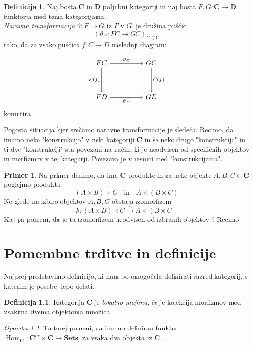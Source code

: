 \documentclass[12pt,a4paper]{book}
\theoremstyle{definition}
\newtheorem{definicija}{Definicija}[chapter]
\theoremstyle{plain}
\theoremstyle{definition}
\newtheorem{primer}{Primer}[section]
\theoremstyle{remark}
\newtheorem*{opomba}{Opomba}
\newcommand{\cat}[1]{\textbf{#1}}
\DeclareMathOperator{\Hom}{Hom}
\begin{document}
\begin{definicija}
Naj bosta $\cat{C}$ in $\cat{D}$ poljubni kategoriji in naj bosta $F,G : \cat{C} \to \cat{D}$ funktorja med tema kategorijama. \\
\textit{Naravna transformacija} $\vartheta : F \Rightarrow G$ iz $F$ v $G$, je družina puščic 
$$(\vartheta_C : FC \to GC)_{C \in \cat{C}}$$
tako, da za vsako puščico $f : C \to D$ naslednji diagram:

\begin{equation}
\begin{tikzcd}[sep=huge]
FC \arrow[r, "\vartheta_C"] \arrow[d, "F(f)"'] & GC \arrow[d, "G(f)"] \\
FD \arrow[r, "\vartheta_D"'] & GD
\end{tikzcd}
\end{equation}
komutira
\end{definicija}


Pogosta situacija kjer srečamo naravne transformacije je sledeča. Recimo, da imamo neko "konstrukcijo" v neki kategoriji \cat{C} in še neko drugo "konstrukcijo" in ti dve "konstrukciji" sta povezani na način, ki je neodvisen od specifičnih objektov in morfizmov v tej kategorji. Povezava je v resnici med "konstrukcijama". 
\begin{primer}
Na primer denimo, da ima \cat{C} produkte in za neke objekte $A,B,C \in \cat{C}$ poglejmo produkta
$$(A \times B) \times C \quad \text{in} \quad A \times (B \times C)$$
Ne glede na izbiro objektov $A,B,C$ obstaja izomorfizem
$$h : (A \times B) \times C \xrightarrow{\sim} A \times (B \times C)$$
Kaj pa pomeni, da je ta izomorfizem neodvisen od izbranih objektov ? Recimo
\end{primer}



\chapter{Pomembne trditve in definicije}

Najprej predstavimo definicijo, ki nam bo omogočala definirati razred kategorij, s katerim je posebej lepo delati.
\begin{definicija}
Kategorija $\cat{C}$ je \emph{lokalno majhna}, če je kolekcija morfizmov med vsakima dvema objektoma množica.
\end{definicija}
\begin{opomba}
To torej pomeni, da imamo definiran funktor $\Hom_{\cat{C}} : \cat{C}^{op} \times \cat{C} \to \cat{Sets}$, za vsaka dva objekta iz $\cat{C}$.
\end{opomba}
\end{document}
